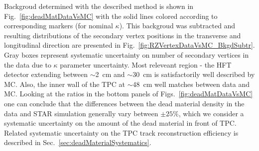 Backgroud determined with the described method is shown in Fig.~\ref{fig:deadMatDataVsMC} with the solid lines colored according to corresponding markers (for nominal $\kappa$). This backgroud was subtracted and resulting distributions of the secondary vertex positions in the transverse and longitudinal direction are presented in Fig.~\ref{fig:RZVertexDataVsMC_BkgdSubtr}. Gray boxes represent systematic uncertainty on number of secondary vertices in the data due to $\kappa$ parameter uncertainty. Most releveant region - the HFT detector extending between $\sim$2~cm and $\sim$30~cm is satisfactorily well described by MC. Also, the inner wall of the TPC at $\sim$48~cm well matches between data and MC. Looking at the ratios in the bottom panels of Figs.~\ref{fig:deadMatDataVsMC} one can conclude that the differences between the dead material density in the data and STAR simulation generally vary between $\pm25\%$, which we consider a systematic uncertainty on the amount of the dead material in front of TPC. Related systematic uncertainty on the TPC track reconstruction efficiency is described in Sec.~\ref{sec:deadMaterialSystematics}.



